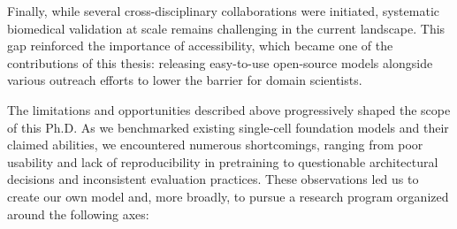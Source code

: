 Finally, while several cross-disciplinary collaborations were initiated, systematic biomedical
validation at scale remains challenging in the current landscape. This gap reinforced the
importance of accessibility, which became one of the contributions of this thesis: releasing
easy-to-use open-source models alongside various outreach efforts to lower the barrier for domain
scientists.

The limitations and opportunities described above progressively shaped the scope of this Ph.D. As
we benchmarked existing single-cell foundation models and their claimed abilities, we encountered
numerous shortcomings, ranging from poor usability and lack of reproducibility in pretraining to
questionable architectural decisions and inconsistent evaluation practices. These observations led
us to create our own model and, more broadly, to pursue a research program organized around the
following axes:

